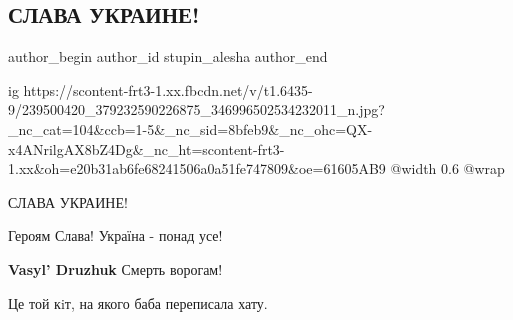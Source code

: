  
 
 
 
 
 
\subsection{СЛАВА УКРАИНЕ!}
\label{sec:24_08_2021.fb.stupin_alesha.1.slava_ukraine}
 
\ifcmt
 author_begin
   author_id stupin_alesha
 author_end
\fi

\ifcmt
  ig https://scontent-frt3-1.xx.fbcdn.net/v/t1.6435-9/239500420_379232590226875_346996502534232011_n.jpg?_nc_cat=104&ccb=1-5&_nc_sid=8bfeb9&_nc_ohc=QX-x4ANrilgAX8bZ4Dg&_nc_ht=scontent-frt3-1.xx&oh=e20b31ab6fe68241506a0a51fe747809&oe=61605AB9
  @width 0.6
  @wrap 
\fi

{\Large СЛАВА УКРАИНЕ!}


 
Героям Слава!
Україна - понад усе!

 
\textbf{Vasyl' Druzhuk} Смерть ворогам!

 
Це той кiт, на якого баба переписала хату.

